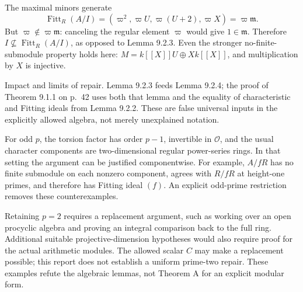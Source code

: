 \documentclass[10pt]{article}
\begin{document}
The maximal minors generate \[\operatorname{Fitt}_R(A/I)
 =(\varpi^2,\varpi U,\varpi(U+2),\varpi X)
 =\varpi\mathfrak m.\] But \(\varpi\notin\varpi\mathfrak m\): canceling the regular element \(\varpi\) would give \(1\in\mathfrak m\). Therefore \(I\not\subseteq\operatorname{Fitt}_R(A/I)\), as opposed to Lemma 9.2.3. Even the stronger no-finite-submodule property holds here: \(M=k[[X]]U\oplus Xk[[X]]\), and multiplication by \(X\) is injective.\par
Impact and limits of repair. Lemma 9.2.3 feeds Lemma 9.2.4; the proof of Theorem 9.1.1 on p. 42 uses both that lemma and the equality of characteristic and Fitting ideals from Lemma 9.2.2. These are false universal inputs in the explicitly allowed algebra, not merely unexplained notation.\par
For odd \(p\), the torsion factor has order \(p-1\), invertible in \(\mathcal O\), and the usual character components are two-dimensional regular power-series rings. In that setting the argument can be justified componentwise. For example, \(A/fR\) has no finite submodule on each nonzero component, agrees with \(R/fR\) at height-one primes, and therefore has Fitting ideal \((f)\). An explicit odd-prime restriction removes these counterexamples.\par
Retaining \(p=2\) requires a replacement argument, such as working over an open procyclic algebra and proving an integral comparison back to the full ring. Additional suitable projective-dimension hypotheses would also require proof for the actual arithmetic modules. The allowed scalar \(C\) may make a replacement possible; this report does not establish a uniform prime-two repair. These examples refute the algebraic lemmas, not Theorem A for an explicit modular form.\par
\end{document}
